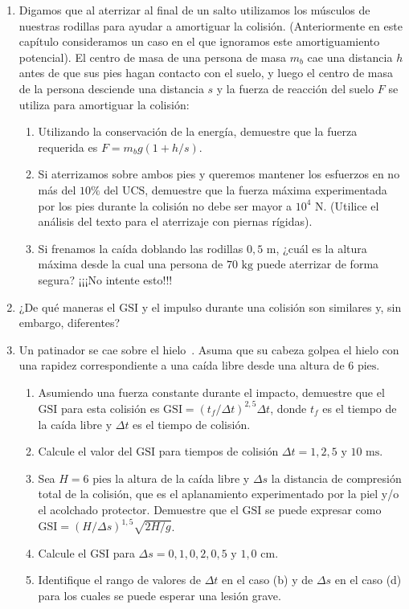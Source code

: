 \documentclass[12pt]{book}
\begin{document}
\begin{enumerate}
\item[3.131] Digamos que al aterrizar al final de un salto utilizamos los músculos de nuestras rodillas para ayudar a amortiguar la colisión. (Anteriormente en este capítulo consideramos un caso en el que ignoramos este amortiguamiento potencial). El centro de masa de una persona de masa $m_b$ cae una distancia $h$ antes de que sus pies hagan contacto con el suelo, y luego el centro de masa de la persona desciende una distancia $s$ y la fuerza de reacción del suelo $F$ se utiliza para amortiguar la colisión:
\begin{enumerate}
\item[(a)] Utilizando la conservación de la energía, demuestre que la fuerza requerida es $F = m_b g(1 + h/s)$.
\item[(b)] Si aterrizamos sobre ambos pies y queremos mantener los esfuerzos en no más del $10\%$ del $\text{UCS}$, demuestre que la fuerza máxima experimentada por los pies durante la colisión no debe ser mayor a $10^4\text{ N}$. (Utilice el análisis del texto para el aterrizaje con piernas rígidas).
\item[(c)] Si frenamos la caída doblando las rodillas $0{,}5\text{ m}$, ¿cuál es la altura máxima desde la cual una persona de $70\text{ kg}$ puede aterrizar de forma segura? ¡¡¡No intente esto!!!
\end{enumerate}

\item[3.132] ¿De qué maneras el $\text{GSI}$ y el impulso durante una colisión son similares y, sin embargo, diferentes?

\item[3.133] Un patinador se cae sobre el hielo~\cite{ref13}. Asuma que su cabeza golpea el hielo con una rapidez correspondiente a una caída libre desde una altura de $6\text{ pies}$.
\begin{enumerate}
\item[(a)] Asumiendo una fuerza constante durante el impacto, demuestre que el $\text{GSI}$ para esta colisión es $\text{GSI} = (t_f/\Delta t)^{2{,}5} \Delta t$, donde $t_f$ es el tiempo de la caída libre y $\Delta t$ es el tiempo de colisión.
\item[(b)] Calcule el valor del $\text{GSI}$ para tiempos de colisión $\Delta t = 1, 2, 5\text{ y } 10\text{ ms}$.
\item[(c)] Sea $H = 6\text{ pies}$ la altura de la caída libre y $\Delta s$ la distancia de compresión total de la colisión, que es el aplanamiento experimentado por la piel y/o el acolchado protector. Demuestre que el $\text{GSI}$ se puede expresar como $\text{GSI} = (H/\Delta s)^{1{,}5} \sqrt{2H/g}$.
\item[(d)] Calcule el $\text{GSI}$ para $\Delta s = 0{,}1, 0{,}2, 0{,}5\text{ y } 1{,}0\text{ cm}$.
\item[(e)] Identifique el rango de valores de $\Delta t$ en el caso (b) y de $\Delta s$ en el caso (d) para los cuales se puede esperar una lesión grave.
\end{enumerate}


\end{enumerate}
\end{document}

